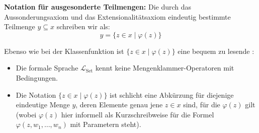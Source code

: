 \begin{math-stroke}
\begin{axioms}
\end{axioms}

\textbf{Notation für ausgesonderte Teilmengen:}
Die durch das Aussonderungsaxiom und das Extensionalitätsaxiom eindeutig bestimmte Teilmenge $y \subseteq x$ schreiben wir als:
\[
y = \{ z \in x \mid \varphi(z) \}
\]

\begin{explanation-of-steps}
Ebenso wie bei der Klassenfunktion ist $\{ z \in x \mid \varphi(z) \}$ eine bequem zu lesende :
\begin{itemize}
    \item Die formale Sprache $\mathcal{L}_{\text{Set}}$ kennt keine Mengenklammer-Operatoren mit Bedingungen.
    \item Die Notation $\{ z \in x \mid \varphi(z) \}$ ist schlicht eine Abkürzung für diejenige eindeutige Menge $y$, deren Elemente genau jene $z \in x$ sind, für die $\varphi(z)$ gilt (wobei $\varphi(z)$ hier informell als Kurzschreibweise für die Formel $\varphi(z, w_1, \dots, w_n)$ mit Parametern steht).
\end{itemize}
\end{explanation-of-steps}
\end{math-stroke}

